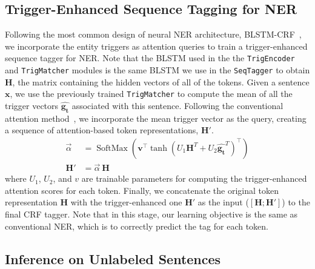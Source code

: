 \subsection{Trigger-Enhanced Sequence Tagging for NER}
\label{sec:secondstage}
Following the most common design of neural NER architecture, BLSTM-CRF~\citep{DBLP:conf/acl/MaH16}, we incorporate the entity triggers as attention queries 
to train a trigger-enhanced sequence tagger for NER. Note that the BLSTM used in the the \texttt{TrigEncoder} and \texttt{TrigMatcher} modules is the same BLSTM we use in the \texttt{SeqTagger} to obtain $\mathbf{H}$, the matrix containing the hidden vectors of all of the tokens.
Given a sentence $\mathbf{x}$, we use the previously trained \texttt{TrigMatcher} to compute the mean of all the trigger vectors $\hat{\mathbf{g_t}}$ associated with this sentence.
Following the conventional attention method~\citep{luong2015effective}, 
we incorporate the mean trigger vector as the query, creating a sequence of attention-based token representations, $\mathbf{H}'$.
{
    {
        \begin{align*} 
            \vec{\alpha}  &= \operatorname{SoftMax}\left(\boldsymbol{v}^{\top} \tanh \left({U}_{1}\mathbf{H}^T + {U}_{2}\hat{\mathbf{g_t}}^T \right)^{\top}\right)\\
            \mathbf{H'} &=  \vec{\alpha}~\mathbf{H}
        \end{align*} 
    }
}
\noindent
where $U_1$, $U_2$, and $v$ are trainable parameters for computing the trigger-enhanced attention scores for each token.
Finally, we concatenate the original token representation $\mathbf{H}$ with the trigger-enhanced one $\mathbf{H}'$ as the input ($[\mathbf{H};\mathbf{H}']$) to the final CRF tagger.
Note that in this stage, our learning objective is the same as conventional NER, which is to correctly predict the tag for each token.




\subsection{Inference on Unlabeled Sentences}
\label{sec:inference}

